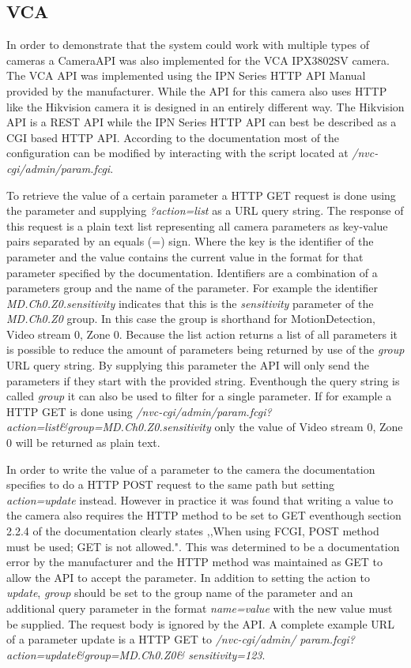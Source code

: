 \subsection{VCA}
In order to demonstrate that the system could work with multiple types of cameras a CameraAPI was also implemented for the VCA IPX3802SV camera.
The VCA API was implemented using the IPN Series HTTP API Manual\cite{udp_technology_ltd_ipn_2018} provided by the manufacturer.
While the API for this camera also uses HTTP like the Hikvision camera it is designed in an entirely different way.
The Hikvision API is a REST API while the IPN Series HTTP API can best be described as a CGI based HTTP API.
According to the documentation most of the configuration can be modified by interacting with the script located at \emph{/nvc-cgi/admin/param.fcgi}.

To retrieve the value of a certain parameter a HTTP GET request is done using the parameter and supplying \emph{?action=list} as a URL query string.
The response of this request is a plain text list representing all camera parameters as key-value pairs separated by an equals (=) sign. Where the key is the identifier of the parameter and the value contains the current value in the format for that parameter specified by the documentation.
Identifiers are a combination of a parameters group and the name of the parameter.
For example the identifier \emph{MD.Ch0.Z0.sensitivity} indicates that this is the \emph{sensitivity} parameter of the \emph{MD.Ch0.Z0} group.
In this case the group is shorthand for MotionDetection, Video stream 0, Zone 0.
Because the list action returns a list of all parameters it is possible to reduce the amount of parameters being returned by use of the \emph{group} URL query string.
By supplying this parameter the API will only send the parameters if they start with the provided string.
Eventhough the query string is called \emph{group} it can also be used to filter for a single parameter.
If for example a HTTP GET is done using \emph{/nvc-cgi/admin/param.fcgi? action=list\&group=MD.Ch0.Z0.sensitivity} only the value of Video stream 0, Zone 0 will be returned as plain text.

In order to write the value of a parameter to the camera the documentation specifies to do a HTTP POST request to the same path but setting \emph{action=update} instead.
However in practice it was found that writing a value to the camera also requires the HTTP method to be set to GET eventhough section 2.2.4 of the documentation clearly states ,,When using FCGI, POST method must be used; GET is not allowed."\cite{udp_technology_ltd_ipn_2018}.
This was determined to be a documentation error by the manufacturer and the HTTP method was maintained as GET to allow the API to accept the parameter.
In addition to setting the action to \emph{update}, \emph{group} should be set to the group name of the parameter and an additional query parameter in the format \emph{name=value} with the new value must be supplied.
The request body is ignored by the API.
A complete example URL of a parameter update is a HTTP GET to \emph{/nvc-cgi/admin/ param.fcgi?action=update\&group=MD.Ch0.Z0\& sensitivity=123}.

